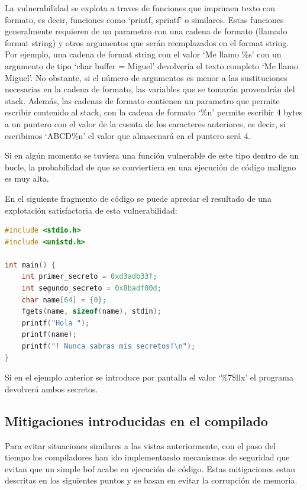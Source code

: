 La vulnerabilidad se explota a traves de funciones que imprimen texto con formato, es decir, funciones como `printf, sprintf' o similares.
Estas funciones generalmente requieren de un parametro con una cadena de formato (llamado format string) y otros argumentos que serán reemplazados en el format string.
Por ejemplo, una cadena de format string con el valor `Me llamo \%s' con un argumento de tipo `char \*buffer = Miguel' devolvería el texto completo `Me llamo Miguel'.
No obstante, si el número de argumentos es menor a las sustituciones necesarias en la cadena de formato, las variables que se tomarán provendrán del stack.
Además, las cadenas de formato contienen un parametro que permite escribir contenido al stack, con la cadena de formato `\%n' permite escribir 4 bytes a un puntero con el valor de la cuenta de los caracteres anteriores, es decir, si escribimos `ABCD\%n' el valor que almacenará en el puntero será 4.

Si en algún momento se tuviera una función vulnerable de este tipo dentro de un bucle, la probabilidad de que se conviertiera en una ejecución de código maligno es muy alta.

En el siguiente fragmento de código se puede apreciar el resultado de una explotación satisfactoria de esta vulnerabilidad:
\pagebreak
\begin{lstlisting}[language=C, caption=Vulnerabilidad de tipo Format String]
#include <stdio.h>
#include <unistd.h>

int main() {
    int primer_secreto = 0xd3adb33f;
    int segundo_secreto = 0x8badf00d;
    char name[64] = {0};
    fgets(name, sizeof(name), stdin);
    printf("Hola ");
    printf(name);
    printf("! Nunca sabras mis secretos!\n");
}
\end{lstlisting}

Si en el ejemplo anterior se introduce por pantalla el valor `\%7\$llx' el programa devolverá ambos secretos.

\subsection{Mitigaciones introducidas en el compilado} \label{subsec:mitigaciones}
Para evitar situaciones similares a las vistas anteriormente, con el paso del tiempo los compiladores han ido implementando mecanismos de seguridad que evitan que un simple \acrshort{bof} acabe en ejecución de código.
Estas mitigaciones estan descritas en los siguientes puntos y se basan en evitar la corrupción de memoria.

